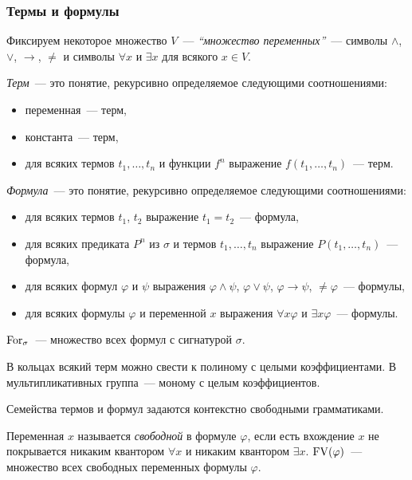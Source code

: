 \subsubsection{Термы и формулы}

\begin{definition}
	Фиксируем некоторое множество $V$~— \emph{“множество переменных”}~— символы $\wedge$, $\vee$, $\to$, $\neq$ и символы $\forall x$ и $\exists x$ для всякого $x \in V$.
	
	\emph{Терм}~— это понятие, рекурсивно определяемое следующими соотношениями:
	\begin{itemize}
		\item переменная~— терм,
		\item константа~— терм,
		\item для всяких термов $t_1, \dots, t_n$ и функции $f^n$ выражение $f(t_1, \dots, t_n)$~— терм.
	\end{itemize}

	\emph{Формула}~— это понятие, рекурсивно определяемое следующими соотношениями:
	\begin{itemize}
		\item для всяких термов $t_1$, $t_2$ выражение $t_1 = t_2$~— формула,
		\item для всяких предиката $P^n$ из $\sigma$ и термов $t_1, \dots, t_n$ выражение $P(t_1, \dots, t_n)$~— формула,
		\item для всяких формул $\varphi$ и $\psi$ выражения $\varphi \wedge \psi$, $\varphi \vee \psi$, $\varphi \to \psi$, $\neq \varphi$~— формулы,
		\item для всяких формулы $\varphi$ и переменной $x$ выражения $\forall x \varphi$ и $\exists x \varphi$~— формулы.
	\end{itemize}
	$\operatorname{For}_\sigma$~— множество всех формул с сигнатурой $\sigma$.
\end{definition}

\begin{exmpl}
	В кольцах всякий терм можно свести к полиному с целыми коэффициентами. В мультипликативных группа~— моному с целым коэффициентов.
\end{exmpl}

\begin{task}
	Семейства термов и формул задаются контекстно свободными грамматиками.
\end{task}

\begin{definition}
	Переменная $x$ называется \emph{свободной} в формуле $\varphi$, если есть вхождение $x$ не покрывается никаким квантором $\forall x$ и никаким квантором $\exists x$. $\operatorname{FV}(\varphi)$~— множество всех свободных переменных формулы $\varphi$.
\end{definition}


